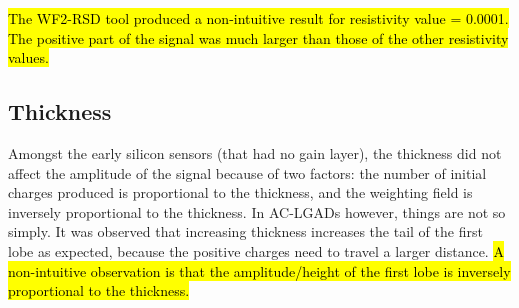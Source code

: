 \documentclass[11pt]{article}
\newcommand{\hlyellow}[1]{{\sethlcolor{yellow}\hl{#1}}}
\begin{document}
\hlyellow{The WF2-RSD tool produced a non-intuitive result for resistivity value = 0.0001. The positive part of the signal was much larger than those of the other resistivity values.}

\subsection{Thickness}
Amongst the early silicon sensors (that had no gain layer), the thickness did not affect the amplitude of the signal because of two factors: the number of initial charges produced is proportional to the thickness, and the weighting field is inversely proportional to the thickness. In AC-LGADs however, things are not so simply. It was observed that increasing thickness increases the tail of the first lobe as expected, because the positive charges need to travel a larger distance. \hlyellow{A non-intuitive observation is that the amplitude/height of the first lobe is inversely proportional to the thickness.}
\end{document}
